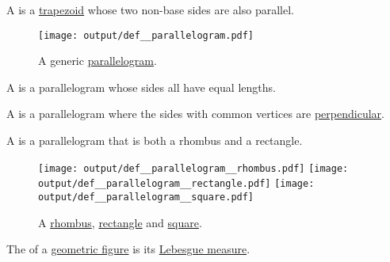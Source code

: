 \begin{definition}\label{def:parallelogram}
  A  is a \hyperref[def:trapezoid]{trapezoid} whose two non-base sides are also parallel.

  \begin{figure}[!ht]
    \centering
    \texttt{[image: output/def\_\_parallelogram.pdf]}
    \caption{A generic \hyperref[def:parallelogram]{parallelogram}.}\label{fig:def:parallelogram}
  \end{figure}

  \begin{thmenum}
     A  is a parallelogram whose sides all have equal lengths.

     A  is a parallelogram where the sides with common vertices are \hyperref[def:perpendicularity]{perpendicular}.

     A  is a parallelogram that is both a rhombus and a rectangle.

    \begin{figure}[!ht]
      \hfill
      \texttt{[image: output/def\_\_parallelogram\_\_rhombus.pdf]}
      \hfill
      \hfill
      \texttt{[image: output/def\_\_parallelogram\_\_rectangle.pdf]}
      \hfill
      \hfill
      \texttt{[image: output/def\_\_parallelogram\_\_square.pdf]}
      \hfill
      \hfill
      \caption{A \hyperref[def:parallelogram/rhombus]{rhombus}, \hyperref[def:parallelogram/rectangle]{rectangle} and \hyperref[def:parallelogram/square]{square}.}\label{fig:def:parallelogram/rhombus}
    \end{figure}
  \end{thmenum}
\end{definition}

\begin{definition}\label{def:figure_area}
  The  of a \hyperref[rem:geometric_shape]{geometric figure} is its \hyperref[def:lebesgue_measure]{Lebesgue measure}.
\end{definition}

